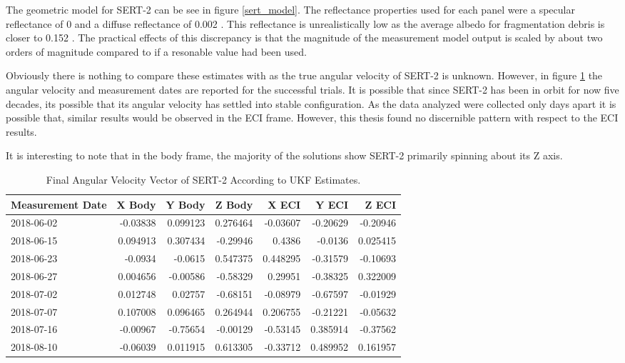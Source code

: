 The geometric model for SERT-2 can be see in figure \ref{sert_model}. The reflectance properties used for each panel were a specular reflectance of 0 and a diffuse reflectance of 0.002 . This reflectance is unrealistically low as the average albedo for fragmentation debris is closer to 0.152 \cite{global_albedo}. The practical effects of this discrepancy is that the magnitude of the measurement model output is scaled by about two orders of magnitude compared to if a resonable value had been used.

Obviously there is nothing to compare these estimates with as the true angular velocity of SERT-2 is unknown. However, in figure \ref{sert_table} the angular velocity and measurement dates are reported for the successful trials. It is possible that since SERT-2 has been in orbit for now five decades, its possible that its angular velocity has settled into stable configuration. As the data analyzed were collected only days apart it is possible that, similar results would be observed in the ECI frame. However, this thesis found no discernible pattern with respect to the ECI results.

It is interesting to note that in the body frame, the majority of the solutions show SERT-2 primarily spinning about its Z axis.

\begin{table}[htbp]\label{sert_table}
	\centering
	
	\begin{tabular}{|l|r|r|r|r|r|r|}
		\hline Measurement Date & X Body & Y Body & Z Body & X ECI & Y ECI & Z ECI \\
		\hline 2018-06-02 & -0.03838 & 0.099123 & 0.276464 & -0.03607 & -0.20629 & -0.20946 \\
		\hline 2018-06-15 & 0.094913 & 0.307434 & -0.29946 & 0.4386 & -0.0136 & 0.025415 \\
		\hline 2018-06-23 & -0.0934 & -0.0615 & 0.547375 & 0.448295 & -0.31579 & -0.10693 \\
		\hline 2018-06-27 & 0.004656 & -0.00586 & -0.58329 & 0.29951 & -0.38325 & 0.322009 \\
		\hline 2018-07-02 & 0.012748 & 0.02757 & -0.68151 & -0.08979 & -0.67597 & -0.01929 \\
		\hline 2018-07-07 & 0.107008 & 0.096465 & 0.264944 & 0.206755 & -0.21221 & -0.05632 \\
		\hline 2018-07-16 & -0.00967 & -0.75654 & -0.00129 & -0.53145 & 0.385914 & -0.37562 \\
		\hline 2018-08-10 & -0.06039 & 0.011915 & 0.613305 & -0.33712 & 0.489952 & 0.161957 \\
		\hline 
	\end{tabular}%
	\caption{Final Angular Velocity Vector of SERT-2 According to UKF Estimates.}
\end{table}%



